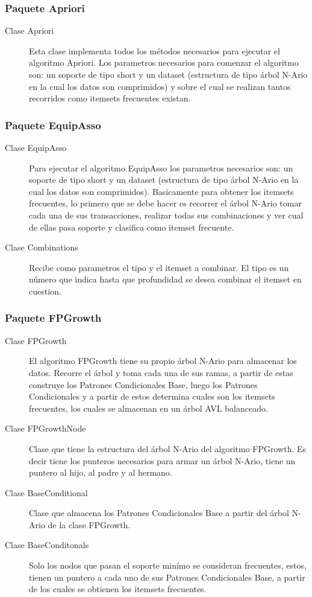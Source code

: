 \subsubsection{Paquete Apriori}
\begin{description}
\item [Clase Apriori] Esta clase implementa todos los m\'etodos necesarios para ejecutar el algoritmo Apriori. Los
parametros necesarios para comenzar el algoritmo son: un soporte de tipo short y un dataset (estructura de tipo
\'arbol N-Ario en la cual los datos son comprimidos) y sobre el cual se realizan tantos recorridos como itemsets
frecuentes existan.
\end{description}

\subsubsection{Paquete EquipAsso}
\begin{description}
\item [Clase EquipAsso] Para ejecutar el algoritmo EquipAsso los parametros necesa\-rios son: un soporte de tipo
short y un dataset (estructura de tipo \'arbol N-Ario en la cual los datos son comprimidos). Basicamente para
obtener los itemsets frecuentes, lo primero que se debe hacer es recorrer el \'arbol N-Ario tomar cada una de
sus transacciones, realizar todas sus combinaciones y ver cual de ellas pasa soporte y clasifica como itemset
frecuente.
\item [Clase Combinations] Recibe como parametros el tipo y el itemset a combinar. El tipo es un n\'umero que
indica hasta que profundidad se desea combinar el itemset en cuestion.
\end{description}

\subsubsection{Paquete FPGrowth}
\begin{description}
\item [Clase FPGrowth] El algoritmo FPGrowth tiene su propio \'arbol N-Ario para almacenar los datos. Recorre el
\'arbol y toma cada una de sus ramas, a partir de estas construye los Patrones Condicionales Base, luego los
Patrones Condicionales y a partir de estos determina cuales son los itemsets frecuentes, los cuales se almacenan en
un \'arbol AVL balanceado.
\item [Clase FPGrowthNode] Clase que tiene la estructura del \'arbol N-Ario del algoritmo FPGrowth. Es decir tiene
los punteros necesarios para armar un \'arbol N-Ario, tiene un puntero al hijo, al padre y al hermano.
\item [Clase BaseConditional] Clase que almacena los Patrones Condicionales Base a partir del \'arbol N-Ario de la 
clase FPGrowth.
\item [Clase BaseConditonals] Solo los nodos que pasan el soporte min\'imo se consi\-deran frecuentes, estos, tienen
un puntero a cada uno de sus Patrones Condicionales Base, a partir de los cuales se obtienen los itemsets
frecuentes.
\end{description}

